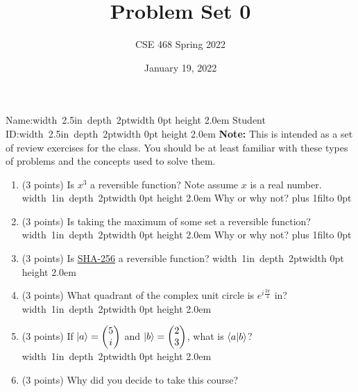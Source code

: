 \documentclass[12pt]{article}
\title{Problem Set 0}
\author{CSE 468 Spring 2022}
\date{January 19, 2022}
\newcommand{\Blank}{\mbox{\hskip 4pt\vrule width 1in depth 2pt}\vrule width 0pt height 2.0em}
\newcommand{\NameBlank}{\mbox{\hskip 4pt\vrule width 2.5in depth 2pt}\vrule width 0pt height 2.0em}
\def\DefaultSpace{1in}
\newcommand{\LeaveSpace}[1][\DefaultSpace]{%
\vskip #1 plus 1fil\relax\hbox to 0pt{\hss} %
}
\begin{document}
\maketitle

\noindent Name:\NameBlank{} \newline
\noindent Student ID:\NameBlank{} \newline
\newline
\noindent \textbf{Note:} This is intended as a set of review exercises for the class. You should be at least familiar with these types of problems and the concepts used to solve them.

\begin{enumerate}[font=\bfseries]
    \item (3 points) Is $x^3$ a reversible function? Note assume $x$ is a real number. \Blank{} Why or why not? \LeaveSpace[0.5in]
    \item (3 points) Is taking the maximum of some set a reversible function? \Blank{} Why or why not?\LeaveSpace{}
    \item (3 points) Is \href{https://en.wikipedia.org/wiki/SHA-2}{SHA-256} a reversible function? \Blank{} 
    \item (3 points) What quadrant of the complex unit circle is $e^{i\frac{3\pi}{4}}$ in?\Blank{}
    \item (3 points) If $\ket{a} = \begin{pmatrix}5 \\ i \end{pmatrix}$ and $\ket{b} = \begin{pmatrix}2 \\ 3 \end{pmatrix}$, what is $\braket{a|b}$?\Blank{}
    \item (3 points) Why did you decide to take this course? \newline
    
\end{enumerate}
\end{document}
